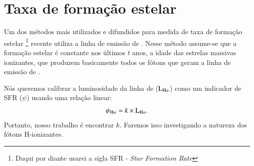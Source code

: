 \section{Taxa de formação estelar}
\label{sec:emlines:SFR}

Um dos métodos mais utilizados e difundidos para medida de taxa de formação estelar \footnote{Daqui
por diante usarei a sigla SFR - {\em Star Formation Rate}} recente utiliza a linha de emissão de
\Halpha. Nesse método assume-se que a formação estelar é constante nos últimos $t$ anos, a idade das
estrelas massivas ionizantes, que produzem basicamente todos os fótons que geram a linha de emissão
de \Halpha.

Nós queremos calibrar a luminosidade da linha de \Halpha ($\mathrm{L}_{\Halpha}$) como um indicador
de SFR ($\psi$) \citep[e.g., ][]{Kennicutt.1998a} usando uma relação linear:
\begin{equation}
	\psi_{\Halpha} = k \times \mathrm{L}_{\Halpha}.
	\label{eq:SFRHa}
\end{equation}
\noindent Portanto, nosso trabalho é encontrar $k$. Faremos isso investigando a natureza dos 
fótons H-ionizantes.

